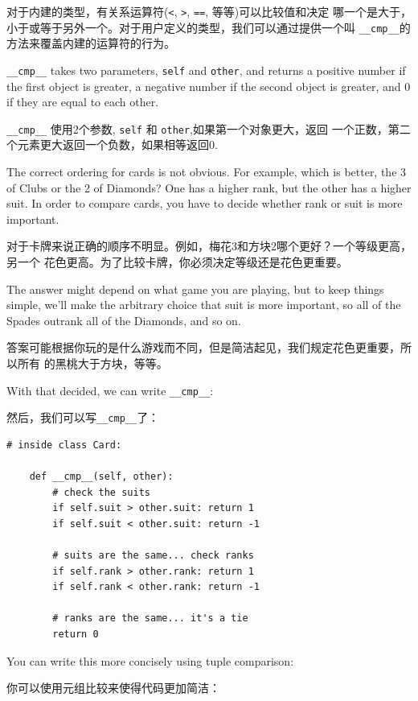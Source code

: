 \documentclass[10pt]{book}
\begin{document}
\begin{CJK}{UTF8}{gbsn}
对于内建的类型，有关系运算符({\tt <}, {\tt >}, {\tt ==}, 等等)可以比较值和决定
哪一个是大于，小于或等于另外一个。对于用户定义的类型，我们可以通过提供一个叫
\verb"__cmp__"的方法来覆盖内建的运算符的行为。

\verb"__cmp__" takes two parameters, {\tt self} and {\tt other},
and returns a positive number if the first object is greater, a
negative number if the second object is greater, and 0 if they are
equal to each other.

\verb"__cmp__" 使用2个参数, {\tt self} 和 {\tt other},如果第一个对象更大，返回
一个正数，第二个元素更大返回一个负数，如果相等返回0.

The correct ordering for cards is not obvious.
For example, which
is better, the 3 of Clubs or the 2 of Diamonds?  One has a higher
rank, but the other has a higher suit.  In order to compare
cards, you have to decide whether rank or suit is more important.

对于卡牌来说正确的顺序不明显。例如，梅花3和方块2哪个更好？一个等级更高，另一个
花色更高。为了比较卡牌，你必须决定等级还是花色更重要。

The answer might depend on what game you are playing, but to keep
things simple, we'll make the arbitrary choice that suit is more
important, so all of the Spades outrank all of the Diamonds,
and so on.

答案可能根据你玩的是什么游戏而不同，但是简洁起见，我们规定花色更重要，所以所有
的黑桃大于方块，等等。

With that decided, we can write \verb"__cmp__":

然后，我们可以写\verb"__cmp__"了：

\begin{verbatim}
# inside class Card:

    def __cmp__(self, other):
        # check the suits
        if self.suit > other.suit: return 1
        if self.suit < other.suit: return -1

        # suits are the same... check ranks
        if self.rank > other.rank: return 1
        if self.rank < other.rank: return -1

        # ranks are the same... it's a tie
        return 0    
\end{verbatim}
%
You can write this more concisely using tuple comparison:

你可以使用元组比较来使得代码更加简洁：


\end{CJK}
\end{document}
